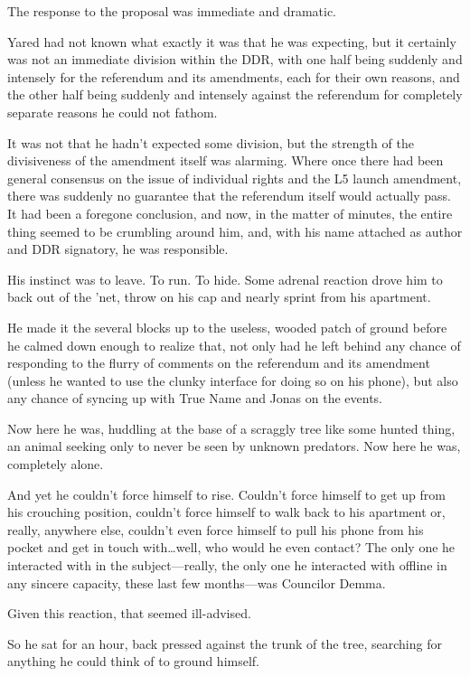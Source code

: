\noindent The response to the proposal was immediate and dramatic.

Yared had not known what exactly it was that he was expecting, but it certainly was not an immediate division within the DDR, with one half being suddenly and intensely for the referendum and its amendments, each for their own reasons, and the other half being suddenly and intensely against the referendum for completely separate reasons he could not fathom.

It was not that he hadn't expected some division, but the strength of the divisiveness of the amendment itself was alarming. Where once there had been general consensus on the issue of individual rights and the L5 launch amendment, there was suddenly no guarantee that the referendum itself would actually pass. It had been a foregone conclusion, and now, in the matter of minutes, the entire thing seemed to be crumbling around him, and, with his name attached as author and DDR signatory, he was responsible.

His instinct was to leave. To run. To hide. Some adrenal reaction drove him to back out of the 'net, throw on his cap and nearly sprint from his apartment.

He made it the several blocks up to the useless, wooded patch of ground before he calmed down enough to realize that, not only had he left behind any chance of responding to the flurry of comments on the referendum and its amendment (unless he wanted to use the clunky interface for doing so on his phone), but also any chance of syncing up with True Name and Jonas on the events.

Now here he was, huddling at the base of a scraggly tree like some hunted thing, an animal seeking only to never be seen by unknown predators. Now here he was, completely alone.

And yet he couldn't force himself to rise. Couldn't force himself to get up from his crouching position, couldn't force himself to walk back to his apartment or, really, anywhere else, couldn't even force himself to pull his phone from his pocket and get in touch with\ldots well, who would he even contact? The only one he interacted with in the subject---really, the only one he interacted with offline in any sincere capacity, these last few months---was Councilor Demma.

Given this reaction, that seemed ill-advised.

So he sat for an hour, back pressed against the trunk of the tree, searching for anything he could think of to ground himself.

